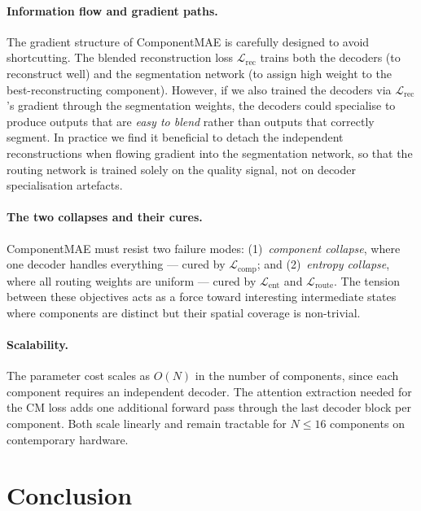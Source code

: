 \documentclass{article}
\begin{document}
\paragraph{Information flow and gradient paths.}
The gradient structure of ComponentMAE is carefully designed to avoid shortcutting.
The blended reconstruction loss $\mathcal{L}_\mathrm{rec}$ trains both the decoders
(to reconstruct well) and the segmentation network (to assign high weight to the
best-reconstructing component).  However, if we also trained the decoders via
$\mathcal{L}_\mathrm{rec}$'s gradient through the segmentation weights, the
decoders could specialise to produce outputs that are \emph{easy to blend} rather
than outputs that correctly segment.  In practice we find it beneficial to detach
the independent reconstructions when flowing gradient into the segmentation network,
so that the routing network is trained solely on the quality signal, not on decoder
specialisation artefacts.

\paragraph{The two collapses and their cures.}
ComponentMAE must resist two failure modes: (1)~\emph{component collapse}, where
one decoder handles everything --- cured by $\mathcal{L}_\mathrm{comp}$; and
(2)~\emph{entropy collapse}, where all routing weights are uniform --- cured by
$\mathcal{L}_\mathrm{ent}$ and $\mathcal{L}_\mathrm{route}$.  The tension between
these objectives acts as a force toward interesting intermediate states where
components are distinct but their spatial coverage is non-trivial.

\paragraph{Scalability.}
The parameter cost scales as $O(N)$ in the number of components, since each
component requires an independent decoder.  The attention extraction needed
for the CM loss adds one additional forward pass through the last decoder
block per component.  Both scale linearly and remain tractable for
$N \leq 16$ components on contemporary hardware.

\section{Conclusion}
\label{sec:conclusion}
\end{document}
